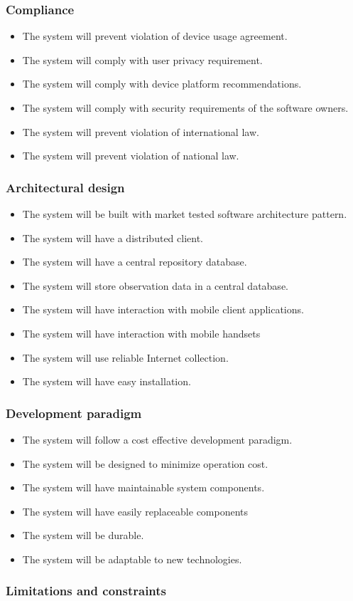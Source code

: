 \subsubsection{Compliance}
		\begin{itemize}
		     \item The system will prevent violation of device usage agreement.
             \item The system will comply with user privacy requirement.
             \item The system will comply with device platform recommendations.
             \item The system will comply with security requirements of the software owners.
             \item The system will prevent violation of international law.
             \item The system will prevent violation of national law.

	    \end{itemize}
\subsubsection{Architectural design}
    \begin{itemize}
        \item The system will be built with market tested software architecture pattern.
        \item The system will have a distributed client.
        \item The system will have a central repository database.
        \item The system will store observation data in a central database.
        \item The system will have interaction with mobile client applications.
        \item The system will have interaction with mobile handsets
        \item The system will use reliable Internet collection.
        \item The system will have easy installation. 

    \end{itemize}
\subsubsection{Development paradigm}
    \begin{itemize}
        \item The system will follow a cost effective development paradigm.
        \item The system will be designed to minimize operation cost.
        \item The system will have maintainable system components.
        \item The system will have easily replaceable components
        \item The system will be durable.
        \item The system will be adaptable to new technologies.

    \end{itemize}
\subsubsection{Limitations and constraints}
